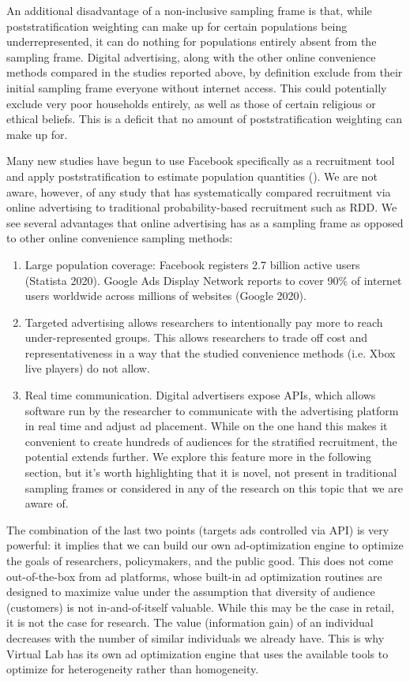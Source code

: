\documentclass[a4paper,12pt]{article}
\theoremstyle{proposition}
\begin{document}
An additional disadvantage of a non-inclusive sampling frame is that, while poststratification weighting can make up for certain populations being underrepresented, it can do nothing for populations entirely absent from the sampling frame. Digital advertising, along with the other online convenience methods compared in the studies reported above, by definition exclude from their initial sampling frame everyone without internet access. This could potentially exclude very poor households entirely, as well as those of certain religious or ethical beliefs. This is a deficit that no amount of poststratification weighting can make up for.

Many new studies have begun to use Facebook specifically as a recruitment tool and apply poststratification to estimate population quantities (\cite{Zagheni2017,Perrotta2020}). We are not aware, however, of any study that has systematically compared recruitment via online advertising to traditional probability-based recruitment such as RDD. We see several advantages that online advertising has as a sampling frame as opposed to other online convenience sampling methods:

\begin{enumerate}
\item Large population coverage: Facebook registers 2.7 billion active users (Statista 2020). Google Ads Display Network reports to cover 90\% of internet users worldwide across millions of websites (Google 2020).

\item Targeted advertising allows researchers to intentionally pay more to reach under-represented groups. This allows researchers to trade off cost and representativeness in a way that the studied convenience methods (i.e. Xbox live players) do not allow.

\item Real time communication. Digital advertisers expose APIs, which allows software run by the researcher to communicate with the advertising platform in real time and adjust ad placement. While on the one hand this makes it convenient to create hundreds of audiences for the stratified recruitment, the potential extends further. We explore this feature more in the following section, but it’s worth highlighting that it is novel, not present in traditional sampling frames or considered in any of the research on this topic that we are aware of.
\end{enumerate}


The combination of the last two points (targets ads controlled via API) is very powerful: it implies that we can build our own ad-optimization engine to optimize the goals of researchers, policymakers, and the public good. This does not come out-of-the-box from ad platforms, whose built-in ad optimization routines are designed to maximize value under the assumption that diversity of audience (customers) is not in-and-of-itself valuable. While this may be the case in retail, it is not the case for research. The value (information gain) of an individual decreases with the number of similar individuals we already have. This is why Virtual Lab has its own ad optimization engine that uses the available tools to optimize for heterogeneity rather than homogeneity.
\end{document}
